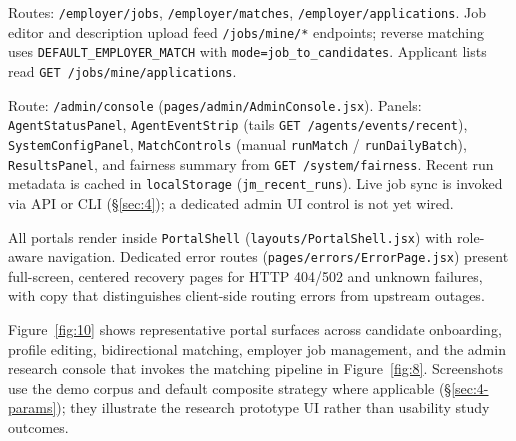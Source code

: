Routes: \texttt{/employer/jobs}, \texttt{/employer/matches}, \texttt{/employer/applications}.
Job editor and description upload feed \texttt{/jobs/mine/*} endpoints; reverse matching uses \texttt{DEFAULT\_EMPLOYER\_MATCH} with \texttt{mode=job\_to\_candidates}.
Applicant lists read \texttt{GET /jobs/mine/applications}.

Route: \texttt{/admin/console} (\texttt{pages/admin/AdminConsole.jsx}).
Panels: \texttt{AgentStatusPanel}, \texttt{AgentEventStrip} (tails \texttt{GET /agents/events/recent}), \texttt{SystemConfigPanel}, \texttt{MatchControls} (manual \texttt{runMatch} / \texttt{runDailyBatch}), \texttt{ResultsPanel}, and fairness summary from \texttt{GET /system/fairness}.
Recent run metadata is cached in \texttt{localStorage} (\texttt{jm\_recent\_runs}).
Live job sync is invoked via API or CLI (\S\ref{sec:4}); a dedicated admin UI control is not yet wired.

All portals render inside \texttt{PortalShell} (\texttt{layouts/PortalShell.jsx}) with role-aware navigation.
Dedicated error routes (\texttt{pages/errors/ErrorPage.jsx}) present full-screen, centered recovery pages for HTTP 404/502 and unknown failures, with copy that distinguishes client-side routing errors from upstream outages.

Figure~\ref{fig:10} shows representative portal surfaces across candidate onboarding, profile editing, bidirectional matching, employer job management, and the admin research console that invokes the matching pipeline in Figure~\ref{fig:8}.
Screenshots use the demo corpus and default composite strategy where applicable (\S\ref{sec:4-params}); they illustrate the research prototype UI rather than usability study outcomes.

